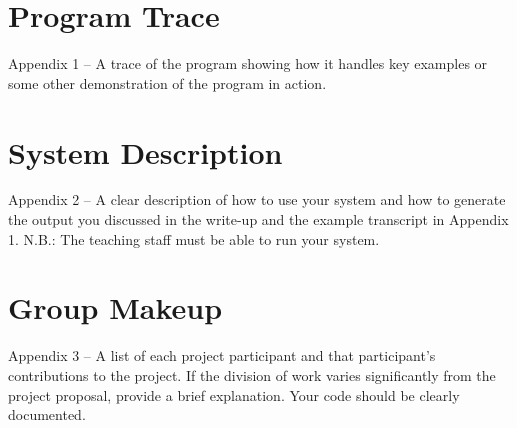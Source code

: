 \documentclass[11pt]{article}
\begin{document}
\begin{multicols}{2}
\appendix

\section{Program Trace}

Appendix 1 – A trace of the program showing how it handles key examples or some other demonstration of the program in action.

\section{System Description}

 Appendix 2 – A clear description of how to use your system and how to generate the output you discussed in the write-up and the example transcript in Appendix 1. N.B.: The teaching staff must be able to run your system.

\section{Group Makeup}

 Appendix 3 – A list of each project participant and that
participant’s contributions to the project. If the division of work
varies significantly from the project proposal, provide a brief
explanation.  Your code should be clearly documented. 



 


\end{multicols}
\end{document}
